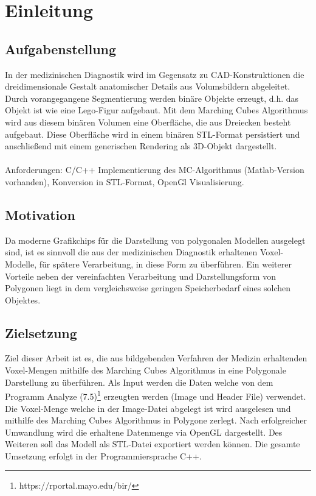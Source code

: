 \chapter{Einleitung}

\section{Aufgabenstellung}
In der medizinischen Diagnostik wird im Gegensatz zu CAD-Konstruktionen die dreidimensionale
Gestalt anatomischer Details aus Volumsbildern abgeleitet. Durch vorangegangene Segmentierung werden binäre Objekte erzeugt, d.h. das Objekt ist wie eine Lego-Figur aufgebaut. Mit dem Marching Cubes Algorithmus wird aus diesem binären Volumen eine Oberfläche, die aus Dreiecken besteht aufgebaut. Diese Oberfläche wird in einem binären STL-Format persistiert und anschließend mit einem generischen Rendering als 3D-Objekt dargestellt.\\\\
Anforderungen: C/C++ Implementierung des MC-Algorithmus (Matlab-Version vorhanden), Konversion in STL-Format, OpenGl Visualisierung.

\section{Motivation}
Da moderne Grafikchips für die Darstellung von polygonalen Modellen ausgelegt sind, ist es sinnvoll die aus der medizinischen Diagnostik erhaltenen Voxel-Modelle, für spätere Verarbeitung, in diese Form zu überführen. Ein weiterer Vorteile neben der vereinfachten Verarbeitung und Darstellungsform von Polygonen liegt in dem vergleichsweise geringen Speicherbedarf eines solchen Objektes.

\section{Zielsetzung}
Ziel dieser Arbeit ist es, die aus bildgebenden Verfahren der Medizin erhaltenden Voxel-Mengen mithilfe des Marching Cubes Algorithmus in eine Polygonale Darstellung zu überführen. Als Input werden die Daten welche von dem Programm Analyze (7.5)\footnote{https://rportal.mayo.edu/bir/} erzeugten werden (Image und Header File) verwendet. Die Voxel-Menge welche in der Image-Datei abgelegt ist wird ausgelesen und mithilfe des Marching Cubes Algorithmus in Polygone zerlegt. Nach erfolgreicher Umwandlung wird die erhaltene Datenmenge via OpenGL dargestellt. Des Weiteren soll das Modell als STL-Datei exportiert werden können. Die gesamte Umsetzung erfolgt in der Programmiersprache C++. 
